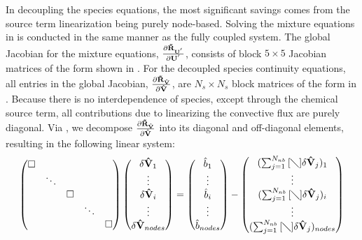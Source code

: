 In decoupling the species equations, the most significant savings comes from the
source term linearization being purely node-based\cite{gnoffo-tp}.  Solving the
mixture equations in is conducted in the same manner as the fully coupled
system.  The global Jacobian for the mixture equations, $\frac{\partial \mathbf{\tilde{R}_{\mathbf{U}^{'}}}}{\partial \mathbf{U}^{'}}$, consists of
block $5 \times 5$ Jacobian matrices of the form shown in .
For the decoupled species continuity equations, all entries in the global
Jacobian, $\frac{\partial \mathbf{\tilde{R}_{\mathbf{\hat{V}}}}}{\partial \mathbf{\hat{V}}}$, are $N_s \times N_s$ block matrices of the form in
.  Because there is no interdependence of species, except
through the chemical source term, all contributions due to linearizing the
convective flux are purely diagonal.  Via , we decompose
$\frac{\partial \mathbf{\tilde{R}_{\mathbf{\hat{V}}}}}{\partial \mathbf{\hat{V}}}$ into its diagonal and off-diagonal elements, resulting in the following
linear system:
\begin{equation}
  \label{dc_sys} 
  \begin{pmatrix} 
    \Box & & & & \\ & \ddots & & & \\ & & \Box \\ & & & \ddots & \\ & & & & \Box
  \end{pmatrix}
  \begin{pmatrix}
    \delta \mathbf{\hat{V}}_1 \\ \vdots \\ \delta \mathbf{\hat{V}}_i \\ 
    \vdots \\ \delta \mathbf{\hat{V}}_{nodes}
  \end{pmatrix}
  =
  \begin{pmatrix}
    \hat{b}_1 \\ \vdots \\ \hat{b}_i \\ \vdots \\ \hat{b}_{nodes} 
  \end{pmatrix}
  -
  \begin{pmatrix}
    (\sum_{j=1}^{N_{nb}}{[\diagdown] \delta\mathbf{\hat{V}}_{j}})_1 \\ \vdots \\
    (\sum_{j=1}^{N_{nb}}{[\diagdown] \delta\mathbf{\hat{V}}_{j}})_i \\ \vdots \\
    (\sum_{j=1}^{N_{nb}}{[\diagdown] \delta\mathbf{\hat{V}}_{j}})_{nodes}
  \end{pmatrix} 
\end{equation} 
